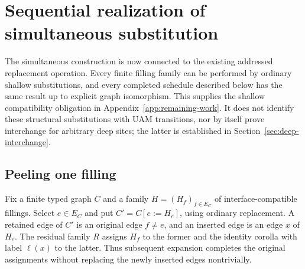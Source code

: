 \section{Sequential realization of simultaneous substitution}
\label{sec:sequential-expansion}
The simultaneous construction is now connected to the existing addressed
replacement operation. Every finite filling family can be performed by
ordinary shallow substitutions, and every completed schedule described below
has the same result up to explicit graph isomorphism. This supplies the
shallow compatibility obligation in Appendix~\ref{app:remaining-work}.
It does not identify these structural substitutions with UAM transitions,
nor by itself prove interchange for arbitrary deep sites; the latter is
established in Section~\ref{sec:deep-interchange}.

\subsection{Peeling one filling}
\begin{definition}\label{term:residual-family}
Fix a finite typed graph $C$ and a family $H=(H_f)_{f\in E_C}$ of
interface-compatible fillings. Select $e\in E_C$ and put $C'=C[e:=H_e]$,
using ordinary replacement. A retained edge of $C'$ is an original edge
$f\ne e$, and an inserted edge is an edge $x$ of $H_e$.
The residual family $R$ assigns $H_f$ to the former and the identity corolla
with label $\ell(x)$ to the latter. Thus subsequent expansion completes the
original assignments without replacing the newly inserted edges nontrivially.
\end{definition}

